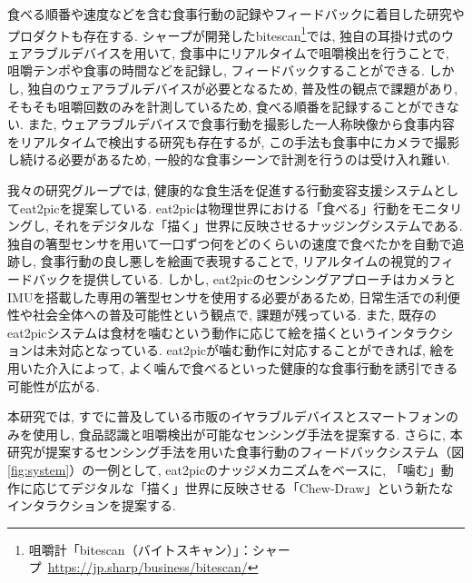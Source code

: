 食べる順番や速度などを含む食事行動の記録やフィードバックに着目した研究やプロダクトも存在する. シャープが開発したbitescan\footnote{咀嚼計「bitescan（バイトスキャン）」：シャープ~\url{https://jp.sharp/business/bitescan/}}では, 独自の耳掛け式のウェアラブルデバイスを用いて, 食事中にリアルタイムで咀嚼検出を行うことで, 咀嚼テンポや食事の時間などを記録し, フィードバックすることができる. しかし, 独自のウェアラブルデバイスが必要となるため, 普及性の観点で課題があり, そもそも咀嚼回数のみを計測しているため, 食べる順番を記録することができない. また, ウェアラブルデバイスで食事行動を撮影した一人称映像から食事内容をリアルタイムで検出する研究も存在するが, この手法も食事中にカメラで撮影し続ける必要があるため, 一般的な食事シーンで計測を行うのは受け入れ難い\cite{10.1145/3551626.3564964}.

我々の研究グループでは, 健康的な食生活を促進する行動変容支援システムとしてeat2picを提案している\cite{10.1145/3580784}. eat2picは物理世界における「食べる」行動をモニタリングし, それをデジタルな「描く」世界に反映させるナッジングシステムである. 独自の箸型センサを用いて一口ずつ何をどのくらいの速度で食べたかを自動で追跡し, 食事行動の良し悪しを絵画で表現することで, リアルタイムの視覚的フィードバックを提供している. しかし, eat2picのセンシングアプローチはカメラとIMUを搭載した専用の箸型センサを使用する必要があるため, 日常生活での利便性や社会全体への普及可能性という観点で, 課題が残っている. また, 既存のeat2picシステムは食材を噛むという動作に応じて絵を描くというインタラクションは未対応となっている. eat2picが噛む動作に対応することができれば, 絵を用いた介入によって, よく噛んで食べるといった健康的な食事行動を誘引できる可能性が広がる.

本研究では, すでに普及している市販のイヤラブルデバイスとスマートフォンのみを使用し, 食品認識と咀嚼検出が可能なセンシング手法を提案する. さらに, 本研究が提案するセンシング手法を用いた食事行動のフィードバックシステム（図\ref{fig:system}）の一例として, eat2picのナッジメカニズムをベースに, 「噛む」動作に応じてデジタルな「描く」世界に反映させる「Chew-Draw」という新たなインタラクションを提案する.

